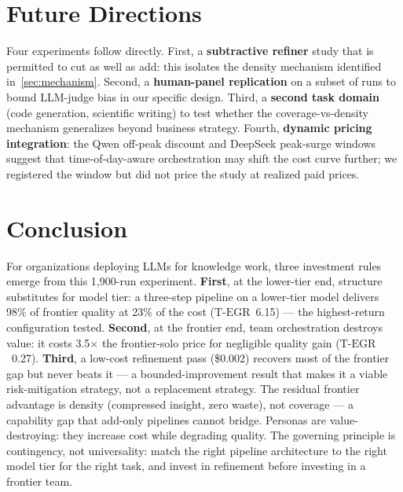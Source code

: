\documentclass[12pt,a4paper]{article}
\newcommand{\TEGR}{\ensuremath{\text{T-EGR}}}
\begin{document}
\section{Future Directions}\label{sec:future}

Four experiments follow directly. First, a \textbf{subtractive refiner} study
that is permitted to cut as well as add: this isolates the density mechanism
identified in~\cref{sec:mechanism}. Second, a \textbf{human-panel replication}
on a subset of runs to bound LLM-judge bias in our specific design. Third, a
\textbf{second task domain} (code generation, scientific writing) to test
whether the coverage-vs-density mechanism generalizes beyond business strategy.
Fourth, \textbf{dynamic pricing integration}: the Qwen off-peak discount and
DeepSeek peak-surge windows suggest that time-of-day-aware orchestration may
shift the cost curve further; we registered the window but did not price the
study at realized paid prices.

\section{Conclusion}\label{sec:conclusion}

For organizations deploying LLMs for knowledge work, three investment rules
emerge from this 1{,}900-run experiment. \textbf{First}, at the lower-tier end,
structure substitutes for model tier: a three-step pipeline on a lower-tier model
delivers 98\% of frontier quality at 23\% of the cost ($\TEGR$~6.15) --- the
highest-return configuration tested. \textbf{Second}, at the frontier end, team
orchestration destroys value: it costs 3.5$\times$ the frontier-solo price for
negligible quality gain ($\TEGR$~0.27). \textbf{Third}, a low-cost refinement pass
(\$0.002) recovers most of the frontier gap but never beats it --- a
bounded-improvement result that makes it a viable risk-mitigation strategy, not
a replacement strategy. The residual frontier advantage is density (compressed
insight, zero waste), not coverage --- a capability gap that add-only pipelines
cannot bridge. Personas are value-destroying: they increase cost while degrading
quality. The governing principle is contingency, not universality: match the
right pipeline architecture to the right model tier for the right task, and
invest in refinement before investing in a frontier team.
\end{document}
